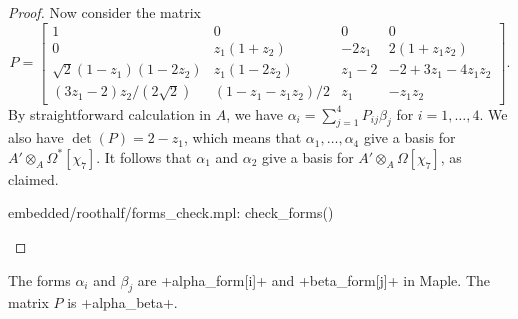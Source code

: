 \documentclass[reqno]{amsart}
\newcommand{\Om}        {\Omega}
\newcommand{\al}        {\alpha}
\newcommand{\bt}        {\beta}
\newcommand{\bbm}       {\left[\begin{matrix}}
\newcommand{\ebm}       {\end{matrix}\right]}
\newcommand{\rt}        {\sqrt{2}}
\newcommand{\ot}        {\otimes}
\renewcommand{\:}{\colon}
\theoremstyle{definition}
\begin{document}
\begin{proof}
 Now consider the matrix
 \[ P = \bbm
     1                  & 0                & 0     & 0            \\
     0                  & z_1(1+z_2)       & -2z_1 & 2(1+z_1z_2)  \\
     \rt(1-z_1)(1-2z_2) & z_1(1-2z_2)      & z_1-2 & -2+3z_1-4z_1z_2 \\
     (3z_1-2)z_2/(2\rt) & (1-z_1-z_1z_2)/2 & z_1   & -z_1z_2
    \ebm.
 \]
 By straightforward calculation in $A$, we have
 $\al_i=\sum_{j=1}^4P_{ij}\bt_j$ for $i=1,\dotsc,4$.  We also have
 $\det(P)=2-z_1$, which means that $\al_1,\dotsc,\al_4$ give a basis
 for $A'\ot_A\Om^*[\chi_7]$.  It follows that $\al_1$ and $\al_2$ give a
 basis for $A'\ot_A\Om[\chi_7]$, as claimed.
 \begin{checks}
  embedded/roothalf/forms_check.mpl: check_forms()
 \end{checks}
\end{proof}
The forms $\al_i$ and $\bt_j$ are \mcode+alpha_form[i]+ and
\mcode+beta_form[j]+ in Maple.  The matrix $P$ is \mcode+alpha_beta+.
\end{document}
